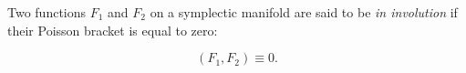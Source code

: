 Two functions $F_1$ and $F_2$ on a symplectic manifold are said to be \textit{in involution} if their Poisson bracket is equal to zero:

$$(F_1, F_2) \equiv 0.$$

